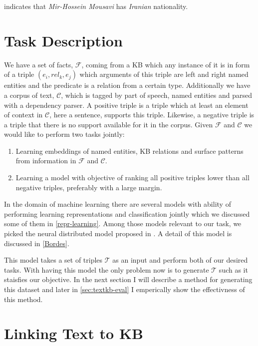indicates that \textit{Mir-Hossein Mousavi} has \textit{Iranian} nationality.

\section{Task Description}
\label{sec:textkb-task}

We have a set of facts, $\mathcal{F}$, coming from a KB which any instance of it
is in form of a triple $(e_{i}, rel_{k}, e_{j})$ which arguments of this triple are
left and right named entities and the predicate is a relation from a certain
type. Additionally we have a corpus of text, $\mathcal{C}$, which is tagged by
part of speech, named entities and parsed with a dependency parser.
A positive triple is a triple which at least an element of context in
$\mathcal{C}$, here a sentence, supports this triple. Likewise, a negative
triple is a triple that there is no support available for it in the corpus.
Given $\mathcal{F}$ and $\mathcal{C}$ we would like to perform two tasks
jointly:

\begin{enumerate}
  \item Learning embeddings of named entities, KB relations and surface patterns
  from information in $\mathcal{F}$ and $\mathcal{C}$.
  \item Learning a model with objective of ranking all positive triples lower
  than all negative triples, preferably with a large margin.
\end{enumerate}

In the domain of machine learning there are several models with ability of
performing learning representations and classification jointly which we
discussed some of them in \autoref{repr-learning}. Among those models relevant
to our task, we picked the neural distributed model proposed in \cite{Bordes2012}.
A detail of this model is discussed in \autoref{Bordes}.

This model takes a set of triples $\mathcal{T}$ as an input and perform both of
our desired tasks. With having this model the only problem now is to generate 
$\mathcal{T}$ such as it staisfies our objective. In the next section I will
describe a method for generating this dataset and later in
\autoref{sec:textkb-eval} I emperically show the effectivness of this method.

\section{Linking Text to KB}
\label{sec:textkb-link}

